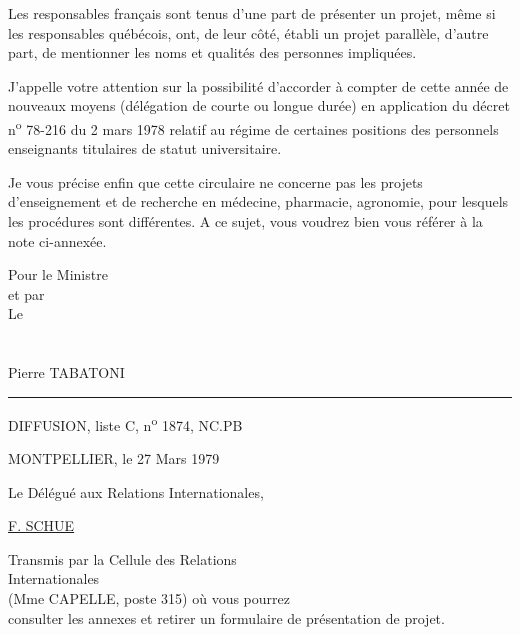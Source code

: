 Les responsables français sont tenus d'une part de présenter un projet, même si les responsables québécois, ont, de leur côté, établi un projet parallèle, d'autre part, de mentionner les noms et qualités des personnes impliquées.

J'appelle votre attention sur la possibilité d'accorder à compter de cette année de nouveaux moyens (délégation de courte ou longue durée) en application du décret n\textsuperscript{o} 78-216 du 2 mars 1978 relatif au régime de certaines positions des personnels enseignants titulaires de statut universitaire.

Je vous précise enfin que cette circulaire ne concerne pas les projets d'enseignement et de recherche en médecine, pharmacie, agronomie, pour lesquels les procédures sont différentes. A ce sujet, vous voudrez bien vous référer à la note ci-annexée.

\begin{flushright}
Pour le Ministre\\
et par \\
Le \\
\\
\\
Pierre TABATONI
\end{flushright}


\hrule
\medskip
DIFFUSION, liste C, n\textsuperscript{o} 1874, NC.PB

MONTPELLIER, le 27 Mars 1979

Le Délégué aux Relations Internationales,


\uline{F. SCHUE}

\begin{flushright}
Transmis par la Cellule des Relations\\
Internationales\\
(Mme CAPELLE, poste 315) où vous pourrez\\
consulter les annexes et retirer un formulaire de présentation de projet.
\end{flushright}

